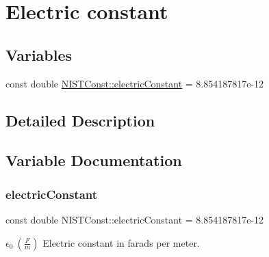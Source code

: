\hypertarget{group___electric_constant}{}\section{Electric constant}
\label{group___electric_constant}
\subsection*{Variables}
\begin{DoxyCompactItemize}
\item 
const double \hyperlink{group___electric_constant_gae5a425228125285727dd53333725ef76}{N\+I\+S\+T\+Const\+::electric\+Constant} = 8.\+854187817e-\/12
\end{DoxyCompactItemize}


\subsection{Detailed Description}


\subsection{Variable Documentation}
\mbox{\label{group___electric_constant_gae5a425228125285727dd53333725ef76}} 
\subsubsection{\texorpdfstring{electric\+Constant}{electricConstant}}
{\footnotesize\ttfamily const double N\+I\+S\+T\+Const\+::electric\+Constant = 8.\+854187817e-\/12}

$\epsilon_0 \ (\frac{F}{m})$ Electric constant in farads per meter. 